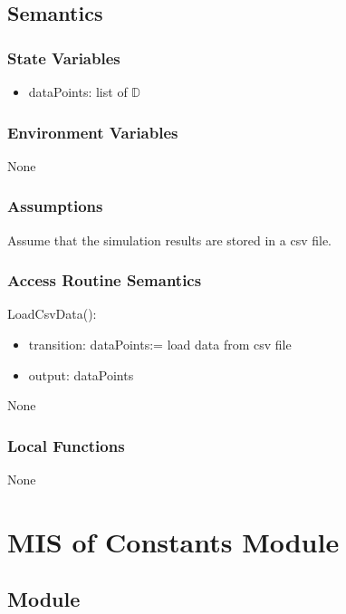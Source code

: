 \documentclass[12pt, titlepage]{article}
\begin{document}
\subsection{Semantics}

\subsubsection{State Variables}

\begin{itemize}
  \item dataPoints: list of $\mathbb{D}$ 
\end{itemize}

\subsubsection{Environment Variables}
None

\subsubsection{Assumptions}

Assume that the simulation results are stored in a csv file.

\subsubsection{Access Routine Semantics}

\noindent LoadCsvData():
\begin{itemize}
\item transition: dataPoints:= load data from csv file
\item output: dataPoints
\end{itemize}

None

\subsubsection{Local Functions}

None

\newpage

\section{MIS of Constants Module} \label{Module_constants} 
\subsection{Module}
\end{document}
